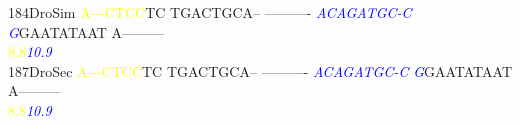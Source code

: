 \documentclass[11pt,twoside,reqno,a4paper]{article}
\begin{document}
{184\hspace*{1\charwidth}DroSim	\textcolor{yellow}{A}\textcolor{yellow}{-}\textcolor{yellow}{-}\textcolor{yellow}{-}\textcolor{yellow}{C}\textcolor{yellow}{T}\textcolor{yellow}{C}\textcolor{yellow}{C}TC	TGACTGCA--	----------	\textit{\textcolor{blue}{A}}\textit{\textcolor{blue}{C}}\textit{\textcolor{blue}{A}}\textit{\textcolor{blue}{G}}\textit{\textcolor{blue}{A}}\textit{\textcolor{blue}{T}}\textit{\textcolor{blue}{G}}\textit{\textcolor{blue}{C}}\textit{\textcolor{blue}{-}}\textit{\textcolor{blue}{C}}	\textit{\textcolor{blue}{G}}GAATATAAT	A---------	\\
\hspace*{4\charwidth}\hspace*{7\charwidth}\hspace*{0\charwidth}\textcolor{yellow}{8.8}\hspace*{1\charwidth}\hspace*{1\charwidth}\hspace*{1\charwidth}\hspace*{27\charwidth}\textit{\textcolor{blue}{10.9}}\hspace*{1\charwidth}\hspace*{1\charwidth}\hspace*{1\charwidth}\\
187\hspace*{1\charwidth}DroSec	\textcolor{yellow}{A}\textcolor{yellow}{-}\textcolor{yellow}{-}\textcolor{yellow}{-}\textcolor{yellow}{C}\textcolor{yellow}{T}\textcolor{yellow}{C}\textcolor{yellow}{C}TC	TGACTGCA--	----------	\textit{\textcolor{blue}{A}}\textit{\textcolor{blue}{C}}\textit{\textcolor{blue}{A}}\textit{\textcolor{blue}{G}}\textit{\textcolor{blue}{A}}\textit{\textcolor{blue}{T}}\textit{\textcolor{blue}{G}}\textit{\textcolor{blue}{C}}\textit{\textcolor{blue}{-}}\textit{\textcolor{blue}{C}}	\textit{\textcolor{blue}{G}}GAATATAAT	A---------	\\
\hspace*{4\charwidth}\hspace*{7\charwidth}\hspace*{0\charwidth}\textcolor{yellow}{8.8}\hspace*{1\charwidth}\hspace*{1\charwidth}\hspace*{1\charwidth}\hspace*{27\charwidth}\textit{\textcolor{blue}{10.9}}\hspace*{1\charwidth}\hspace*{1\charwidth}\hspace*{1\charwidth}\\
}
\end{document}
